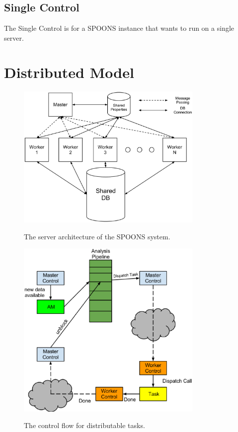\documentclass[12pt]{ucthesis}
\newcommand{\captionfonts}{\small\bf\ssp}
\begin{document}
\subsection{Single Control}
\label{arch-single-control}
The Single Control is for a SPOONS instance that wants to run on a single server.

\section{Distributed Model}
\label{arch-dist}

\begin{figure}
   \begin{center}
      \includegraphics[width=0.8\textwidth]{images/SPOONS_Server_Architecture.eps}
      \captionfonts
      \caption[SPOONS Server Architecture]{The server architecture of the SPOONS system.}
      \label{fig:serverArch}
   \end{center}
\end{figure}

\begin{figure}
   \begin{center}
      \includegraphics[width=0.8\textwidth]{images/SPOONS_Distributable_Task_Control_Flow.eps}
      \captionfonts
      \caption[SPOONS Distributable Task Flow]{The control flow for distributable tasks.}
      \label{fig:taskFlow}
   \end{center}
\end{figure}
\end{document}
